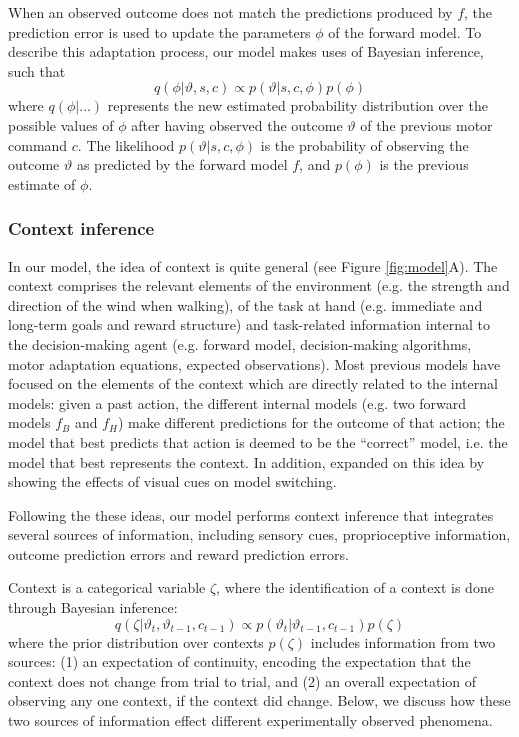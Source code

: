 \documentclass[a4paper,doc,floatsintext,natbib]{apa6}
\def \fref #1{Figure \ref{#1}}     %
\begin{document}
When an observed outcome does not match the predictions produced by $f$, the prediction error is used to update the parameters $\phi$ of the forward model. To describe this adaptation process, our model makes uses of Bayesian inference, such that
\begin{equation}
q(\phi | \vartheta, s, c) \propto p(\vartheta | s, c, \phi)p(\phi) \label{eqn:update-mini}
\end{equation}
where $q(\phi | ...)$ represents the new estimated probability distribution over the possible values of $\phi$ after having observed the outcome $\vartheta$ of the previous motor command $c$. The likelihood $p(\vartheta | s, c, \phi)$ is the probability of observing the outcome $\vartheta$ as predicted by the forward model $f$, and $p(\phi)$ is the previous estimate of $\phi$.

\subsubsection{Context inference}
In our model, the idea of context is quite general (see \fref{fig:model}A). The context comprises the relevant elements of the environment (e.g. the strength and direction of the wind when walking), of the task at hand (e.g. immediate and long-term goals and reward structure) and task-related information internal to the decision-making agent (e.g. forward model, decision-making algorithms, motor adaptation equations, expected observations). Most previous models \cite[e.g.][]{Wolpert_Multiple_1998,Imamizu_Neural_2008,Oh_Minimizing_2019} have focused on the elements of the context which are directly related to the internal models: given a past action, the different internal models (e.g. two forward models $f_B$ and $f_H$) make different predictions for the outcome of that action; the model that best predicts that action is deemed to be the ``correct'' model, i.e. the model that best represents the context. In addition, \cite{Imamizu_Explicit_2007} expanded on this idea by showing the effects of visual cues on model switching.

Following the these ideas, our model performs context inference that integrates several sources of information, including sensory cues, proprioceptive information, outcome prediction errors and reward prediction errors.

Context is a categorical variable $\zeta$, where the identification of a context is done through Bayesian inference:
\begin{equation}
q(\zeta | \vartheta_t, \vartheta_{t-1}, c_{t-1}) \propto p(\vartheta_t | \vartheta_{t-1}, c_{t-1})p(\zeta)
\label{eqn:context-inference-mini}
\end{equation}
where the prior distribution over contexts $p(\zeta)$ includes information from two sources: (1) an expectation of continuity, encoding the expectation that the context does not change from trial to trial, and (2) an overall expectation of observing any one context, if the context did change. Below, we discuss how these two sources of information effect different experimentally observed phenomena.
\end{document}
